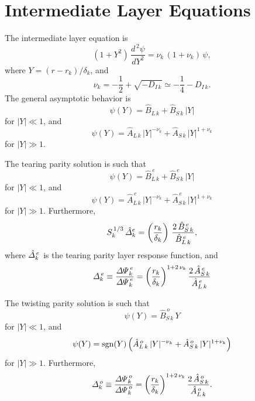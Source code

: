 \documentclass[12pt,prb,aps,notitlepage]{revtex4-1}
\begin{document}
\section{Intermediate Layer Equations}
The intermediate layer equation is
\begin{equation}
(1+Y^2)\,\frac{d^{\,2}\psi}{dY^{2}}= \nu_k\,(1+\nu_k)\,\psi,
\end{equation}
where $Y= (r-r_k)/\delta_k$, and
\begin{equation}
\nu_k = -\frac{1}{2} + \sqrt{-D_{I\,k}}\simeq -\frac{1}{4}-D_{I\,k}.
\end{equation}
The general asymptotic behavior is
\begin{equation}
\psi(Y) = \hat{B}_{L\,k}+ \hat{B}_{S\,k}\,|Y|
\end{equation}
for $|Y|\ll 1$, and
\begin{equation}
\psi(Y)= \hat{A}_{L\,k} \,|Y|^{-\nu_k}+\hat{A}_{S\,k}\,|Y|^{1+\nu_k}
\end{equation}
for $|Y|\gg 1$. 

The tearing parity solution is such that 
\begin{equation}
\psi(Y) = \hat{B}_{L\,k}^{\,e}+ \hat{B}_{S\,k}^{\,e}\,|Y|
\end{equation}
for $|Y|\ll 1$, and
\begin{equation}
\psi(Y)= \hat{A}_{L\,k}^{\,e} \,|Y|^{-\nu_k}+\hat{A}_{S\,k}^{\,e}\,|Y|^{1+\nu_k}
\end{equation}
for $|Y|\gg 1$. Furthermore,
\begin{equation}
S_k^{\,1/3}\,\hat{\mit\Delta}_k^e = \left(\frac{r_k}{\delta_k}\right)\,\frac{2\,\hat{B}_{S\,k}^{\,e}}{\hat{B}_{L\,k}^{\,e}},
\end{equation}
where $\hat{\mit\Delta}_k^{\,e}$ is the tearing parity layer response function, and
\begin{equation}
{\mit\Delta}_k^{\,e} \equiv \frac{{\mit\Delta\Psi}_k^{\,e}}{{\mit\Delta\Psi}_k^{\,e}} = \left(\frac{r_k}{\delta_k}\right)^{1+2\,\nu_k}\frac{2\,\hat{A}_{S\,k}^{\,e}}{\hat{A}_{L\,k}^{\,e}}
\end{equation}

The twisting parity solution is such that 
\begin{equation}
\psi(Y) =  \hat{B}_{S\,k}^{\,o}\,Y
\end{equation}
for $|Y|\ll 1$, and
\begin{equation}
\psi(Y)= {\rm sgn}(Y)\left(\hat{A}_{L\,k}^{\,o} \,|Y|^{-\nu_k}+\hat{A}_{S\,k}^{\,o}\,|Y|^{1+\nu_k}\right)
\end{equation}
for $|Y|\gg 1$. 
Furthermore, 
\begin{equation}
{\mit\Delta}_k^{\,o} \equiv \frac{{\mit\Delta\Psi}_k^{\,o}}{{\mit\Delta\Psi}_k^{\,o}} = \left(\frac{r_k}{\delta_k}\right)^{1+2\,\nu_k}\frac{2\,\hat{A}_{S\,k}^{\,o}}{\hat{A}_{L\,k}^{\,o}}. 
\end{equation}
\end{document}
